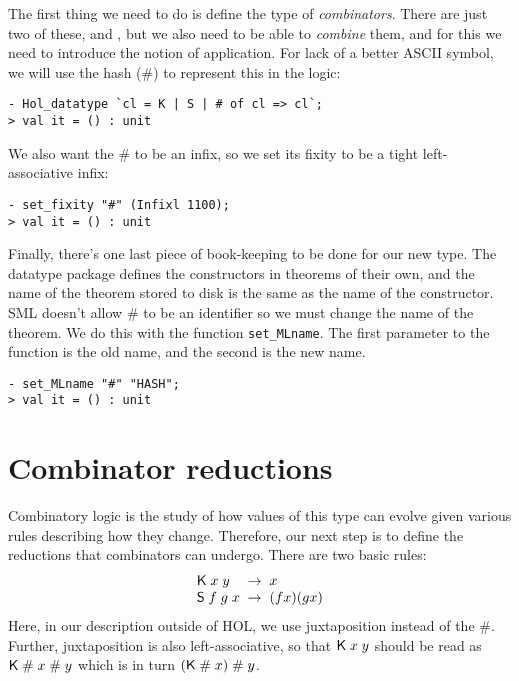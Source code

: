 The first thing we need to do is define the type of
\emph{combinators}.  There are just two of these, \KC{} and \SC, but
we also need to be able to \emph{combine} them, and for this we need
to introduce the notion of application.  For lack of a better ASCII
symbol, we will use the hash (\#) to represent this in the logic:
\setcounter{sessioncount}{0}
\begin{session}
\begin{verbatim}
- Hol_datatype `cl = K | S | # of cl => cl`;
> val it = () : unit
\end{verbatim}
\end{session}
We also want the \# to be an infix, so we set its fixity to be a tight
left-associative infix:
\begin{session}
\begin{verbatim}
- set_fixity "#" (Infixl 1100);
> val it = () : unit
\end{verbatim}
\end{session}
Finally, there's one last piece of book-keeping to be done for our new
type.  The datatype package defines the constructors in theorems of
their own, and the name of the theorem stored to disk is the same as
the name of the constructor.  SML doesn't allow \# to be an identifier
so we must change the name of the theorem.  We do this with the
function \texttt{set\_MLname}.  The first parameter to the function is
the old name, and the second is the new name.
\begin{session}
\begin{verbatim}
- set_MLname "#" "HASH";
> val it = () : unit
\end{verbatim}
\end{session}




\section{Combinator reductions}
\label{sec:Comb-Reduct}

Combinatory logic is the study of how values of this type can evolve
given various rules describing how they change.  Therefore, our next
step is to define the reductions that combinators can undergo.  There
are two basic rules:
\[\begin{array}{l@{\;\;\rightarrow\;\;}l}
\KC\;x\;y & x\\
\SC\;f\;g\;x & (f x)(g x)
\end{array}\]
Here, in our description outside of HOL, we use juxtaposition instead
of the \#.  Further, juxtaposition is also left-associative, so that
${\sf K}\;x\;y$ should be read as ${\sf K}\;\#\;x\;\#\;y$ which is in
turn $({\sf K}\;\#\;x)\;\#\;y$.

